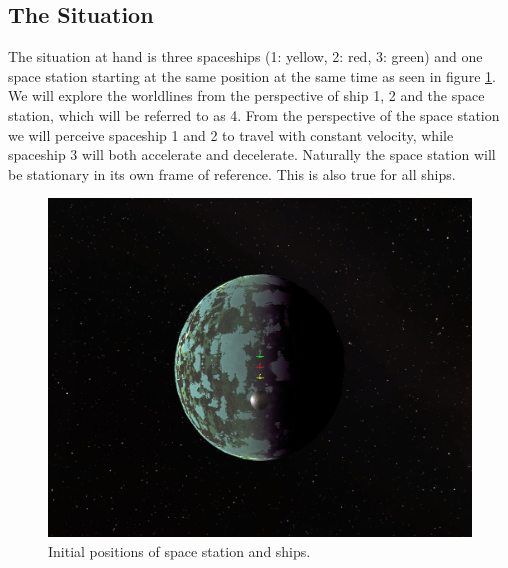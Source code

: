 \documentclass[reprint,english,notitlepage]{revtex4-2}
\begin{document}
  \subsection{The Situation}
  The situation at hand is three spaceships (1: yellow, 2: red, 3: green) and one space station starting at the same position at the same time as seen in figure \ref{fig: Initial position}. We will explore the worldlines from the perspective of ship 1, 2 and the space station, which will be referred to as 4. From the perspective of the space station we will perceive spaceship 1 and 2 to travel with constant velocity, while spaceship 3 will both accelerate and decelerate. Naturally the space station will be stationary in its own frame of reference. This is also true for all ships. 
  \begin{figure}[h!]
    \centering
    \includegraphics[scale = .125]{figures/Spaceships_t_0.png}
    \caption{Initial positions of space station and ships.}
    \label{fig: Initial position}
  \end{figure}
  
\end{document}
